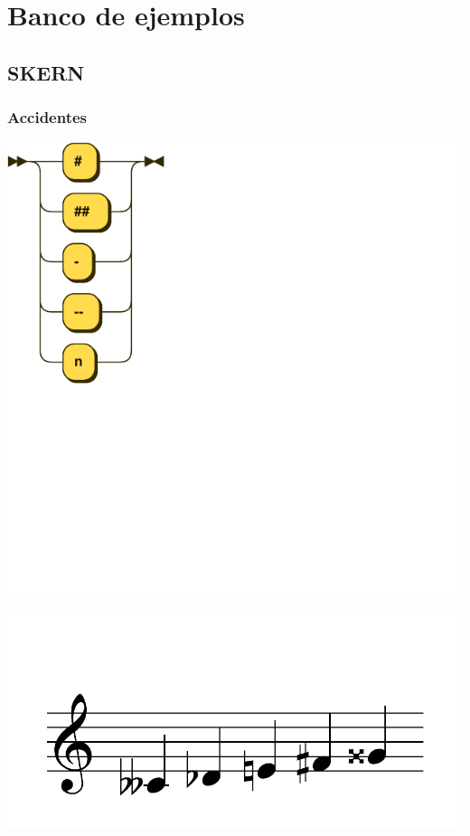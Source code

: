 \documentclass{article}
\begin{document}
\section{Banco de ejemplos}
\subsection{SKERN}
\subsubsection{Accidentes}
\includegraphics[scale=0.5]{figures_railroad/pdf/skern/accidents.pdf}

\includegraphics[scale=0.5]{figures_tests/pdf/skern/accident1.pdf}
\end{document}
